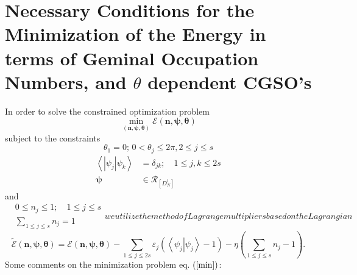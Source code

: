 \documentclass[aps,preprint]{revtex4}%
\begin{document}
\section{Necessary Conditions for the Minimization of the Energy in terms of
Geminal Occupation Numbers, and $\theta$ dependent CGSO's \label{Evariation}}

In order to solve the constrained optimization problem
\begin{equation}
\min_{\left(  \mathbf{n,\psi,\theta}\right)  }\mathcal{E}\left(
\mathbf{n,\psi,\theta}\right)  \label{min}%
\end{equation}
subject to the constraints%
\begin{equation}
\theta_{1}=0;\,0<\theta_{j}\leq2\pi,2\leq j\leq s \label{thetacon}%
\end{equation}%
\begin{align}
\left\langle \left\vert \psi_{j}\right\vert \psi_{k}\right\rangle  &
=\delta_{jk};\quad1\leq j,k\leq2s\label{norm}\\
\mathbf{\psi}  &  \mathbf{\in}\mathcal{R}_{\left[  D_{N}^{1}\right]  }
\label{rep}%
\end{align}
and
\begin{subequations}
\begin{align}
&  0\leq n_{j}\leq1;\quad1\leq j\leq s\label{pos1}\\
&  \sum_{1\leq j\leq s}n_{j}=1
\end{align}
we utilize the method of Lagrange multipliers based on the Lagrangian
\end{subequations}
\begin{equation}
\mathcal{\tilde{E}}\left(  \mathbf{n,\psi,\theta}\right)  =\mathcal{E}\left(
\mathbf{n,\psi,\theta}\right)  -\sum_{1\leq j\leq2s}\varepsilon_{j}\left(
\left\langle \left.  \psi_{j}\right\vert \psi_{j}\right\rangle -1\right)
-\eta\left(  \sum_{1\leq j\leq s}n_{j}-1\right)  . \label{larE}%
\end{equation}
Some comments on the minimization problem eq. $\left(  \ref{min}\right)  $:
\end{document}
